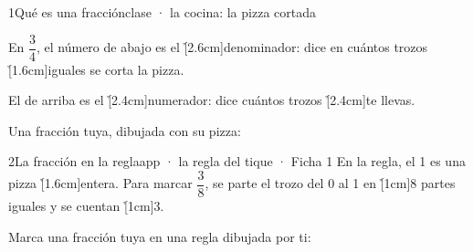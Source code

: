 \documentclass[12pt]{article}
\begin{document}
\portada


\begin{cromo}{1}{Qué es una fracción}{clase · la cocina: la pizza cortada}
\begin{minipage}[c]{.72\linewidth}\raggedright
\completa En $\dfrac{3}{4}$, el número de abajo es el \h[2.6cm]{denominador}: dice en cuántos trozos \h[1.6cm]{iguales} se corta la pizza.\par\vspace{2mm}
El de arriba es el \h[2.4cm]{numerador}: dice cuántos trozos \h[2.4cm]{te llevas}.
\end{minipage}%
\begin{minipage}[c]{.28\linewidth}\centering{}\end{minipage}

\vspace{2mm}
\tuejemplo Una fracción tuya, dibujada con su pizza:
\end{cromo}

\begin{cromo}{2}{La fracción en la regla}{app · la regla del tique · Ficha 1}
\completa En la regla, el 1 es una pizza \h[1.6cm]{entera}. Para marcar $\dfrac{3}{8}$, se parte el trozo del 0 al 1 en \h[1cm]{8} partes iguales y se cuentan \h[1cm]{3}.

\vspace{2mm}
\centerline{}

\vspace{1mm}
\tuejemplo Marca una fracción tuya en una regla dibujada por ti:
\end{cromo}
\end{document}
